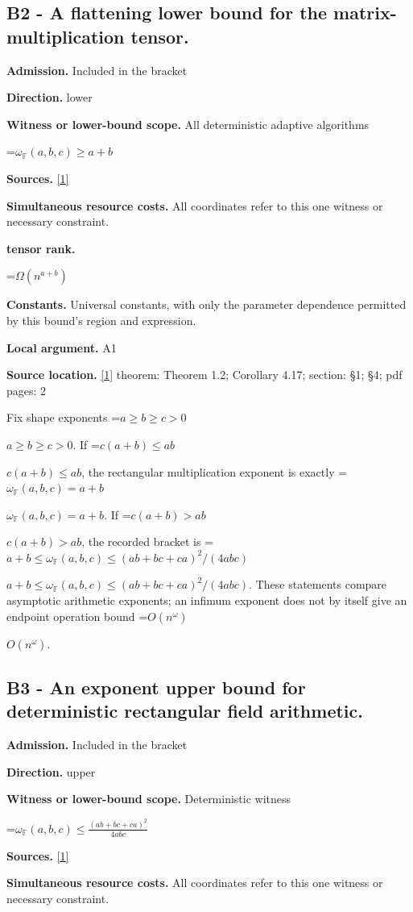\documentclass[10pt,a4paper]{article}
\newcommand{\AtlasMath}[1]{\par\begingroup\centering\setbox0=\hbox{$\displaystyle #1$}\ifdim\wd0>1.4\linewidth\typeout{ATLAS WIDE FORMULA: \the\wd0}\fi\ifdim\wd0>\linewidth\resizebox{\linewidth}{!}{\box0}\else\box0\fi\par\endgroup}
\newcommand{\AtlasInlineMath}[1]{\begingroup\setbox0=\hbox{$#1$}\ifdim\wd0>.4\linewidth\endgroup\AtlasMath{#1}\else\endgroup$#1$\fi}
\begin{document}
\subsection{B2 - A flattening lower bound for the matrix-multiplication tensor.}
\textbf{Admission.} Included in the bracket

\textbf{Direction.} lower

\textbf{Witness or lower-bound scope.} All deterministic adaptive algorithms

\AtlasMath{\omega_{\mathbb{F}}(a,b,c)\ge a+b}
\textbf{Sources.} \href{https://arxiv.org/pdf/2610.30054v1}{[1]}

\textbf{Simultaneous resource costs.} All coordinates refer to this one witness or necessary constraint.

\textbf{tensor rank.}

\AtlasMath{\Omega (n^{a+b})}
\textbf{Constants.} Universal constants, with only the parameter dependence permitted by this bound’s region and expression.

\textbf{Local argument.} A1

\textbf{Source location.} \href{https://arxiv.org/pdf/2610.30054v1}{[1]} theorem: Theorem 1.2; Corollary 4.17; section: §1; §4; pdf pages: 2

Fix shape exponents \AtlasInlineMath{a\ge b\ge c>0}. If \AtlasInlineMath{c(a+b)\le ab}, the rectangular multiplication exponent is exactly \AtlasInlineMath{\omega_{\mathbb F}(a,b,c)=a+b}. If \AtlasInlineMath{c(a+b)>ab}, the recorded bracket is \AtlasInlineMath{a+b\le\omega_{\mathbb F}(a,b,c)\le(ab+bc+ca)^2/(4abc)}. These statements compare asymptotic arithmetic exponents; an infimum exponent does not by itself give an endpoint operation bound \AtlasInlineMath{O(n^\omega)}.

\subsection{B3 - An exponent upper bound for deterministic rectangular field arithmetic.}
\textbf{Admission.} Included in the bracket

\textbf{Direction.} upper

\textbf{Witness or lower-bound scope.} Deterministic witness

\AtlasMath{\omega_{\mathbb{F}}(a,b,c)\le\frac{(ab+bc+ca)^2}{4abc}}
\textbf{Sources.} \href{https://arxiv.org/pdf/2610.30054v1}{[1]}

\textbf{Simultaneous resource costs.} All coordinates refer to this one witness or necessary constraint.
\end{document}
